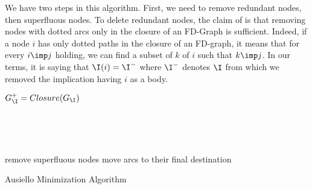 We have two steps in this algorithm. First, we need to remove redundant nodes, 
then superfluous nodes. To delete redundant nodes, the claim of 
\cite{ausiello_graph_1983, ausiello_minimal_1986} is that removing nodes with
dotted arcs only in the closure of an FD-Graph is sufficient. Indeed, if a node
$i$ has only dotted paths in the closure of an FD-graph, it means that for every
$i \imp j$ holding, we can find a subset of $k$ of $i$ such that $k \imp j$. In
our terms, it is saying that $\I(i) = \I^{-}$ where $\I^{-}$ denotes $\I$ from
which we removed the implication having $i$ as a body.


\begin{algorithm}

\BlankLine
\BlankLine

$G_{\I}^{+} = Closure(G_{\I})$ \;

\BlankLine

 \\

\BlankLine

 \\

remove superfluous nodes \;
move arcs to their final destination \;	

\caption{Ausiello Minimization Algorithm}
\label{alg:ausiello-min}
\end{algorithm}

\vspace{1.2em} 

